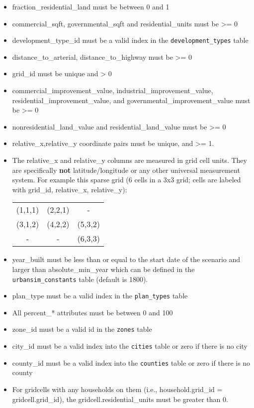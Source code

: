 \begin{itemize} \tight
\item fraction_residential_land must be between 0 and 1
\item commercial_sqft, governmental_sqft and residential_units must be \textgreater{}= 0
\item development_type_id must be a valid index in the \verb|development_types|
table
\item distance_to_arterial,  distance_to_highway must be \textgreater{}= 0
\item grid_id must be unique and \textgreater{} 0
\item commercial_improvement_value,  industrial_improvement_value, residential_improvement_value, 
and governmental_improvement_value 
must be \textgreater{}= 0 
\item nonresidential_land_value and residential_land_value must be \textgreater{}= 0
\item relative_x,relative_y coordinate pairs must be unique, and
\textgreater{}= 1.
\item The relative_x and relative_y columns are measured in grid cell units.
They are specifically \textbf{not} latitude/longitude or any other universal
measurement system. For example this sparse grid (6 cells in a 3x3 grid; cells
are labeled with grid_id, relative_x, relative_y):

\begin{tabular}{ccc}
(1,1,1)  &(2,2,1)  &-  \\
(3,1,2)  &(4,2,2)  &(5,3,2)  \\
-  &-  &(6,3,3)

\end{tabular}

\item year_built must be less than or equal to the start date of the scenario and larger 
than absolute_min_year which can be defined in the \verb|urbansim_constants| table (default is 1800).
\item plan_type must be a valid index in the \verb|plan_types| table
\item All percent_* attributes must be between 0 and 100
\item zone_id must be a valid id in the \verb|zones| table
\item city_id must be a valid index into the \verb|cities| table or zero if
there is no city
\item county_id must be a valid index into the \verb|counties| table or zero if
there is no county
\item For gridcells with any households on them (i.e., household.grid_id =
gridcell.grid_id), the gridcell.residential_units must be greater than 0.
\end{itemize}

